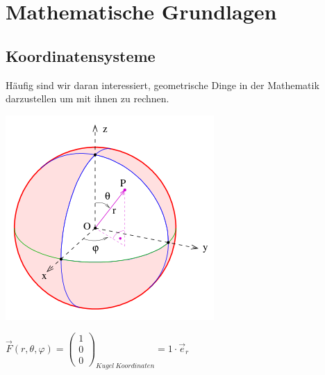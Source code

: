 %
%
%
%
%

					\section{Mathematische Grundlagen}
					\label{chap:Style}

					\subsection{Koordinatensysteme}

					Häufig sind wir daran interessiert, geometrische Dinge in der Mathematik darzustellen um mit ihnen zu rechnen.
					 {}
					\beginip
					\begin{center}

					\includegraphics[scale = 0.5	]{kugelkoord.png}

				\end{center}
					\iend

					\formulaBegin
						$\vec{F}(r, \theta, \varphi) = \left(\begin{array}{c} 1 \\ 0 \\ 0 \end{array}\right)_{Kugel\ Koordinaten} = 1 \cdot \vec{e}_r$ \\

